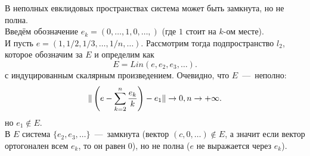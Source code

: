\begin{note}
    В неполных евклидовых пространствах система может быть замкнута, но не полна. \\
    Введём обозначение $e_k = (0, \ldots, 1, 0, \ldots,)$ (где $1$ стоит на $k$-ом месте). \\
    И пусть $e = (1, 1/2, 1/3, \ldots, 1/n, \ldots)$.
    Рассмотрим тогда подпространство $l_2$, которое обозначим за $E$ и определим как
    \[
        E = Lin(e, e_2, e_3, \ldots).
    \]
    с индуцированным скалярным произведением.
    Очевидно, что $E$~---~неполно:
    \[
        \|\left(e - \sum\limits_{k = 2}^n \dfrac{e_k}{k}\right) - e_1\| \rightarrow 0, n \rightarrow +\infty.
    \]
    но $e_1 \notin E$. \\
    В $E$ система $\{e_2, e_3, \ldots\}$~---~замкнута (вектор $(c, 0, \ldots) \notin E$, а значит если вектор ортогонален всем $e_k$, то он равен 0), но не полна ($e$ не выражается через $e_k$).
\end{note}

